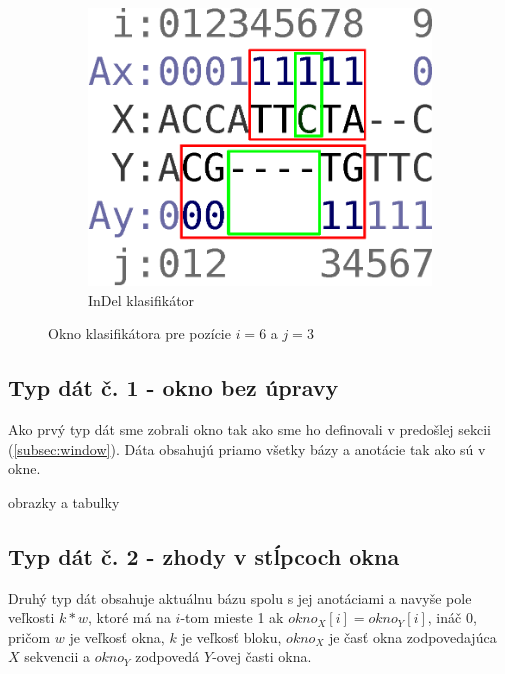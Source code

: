 \begin{figure}[h]
\begin{subfigure}[b]{0.35\textwidth}
                \includegraphics[width=\textwidth]{images/window_i}
                \caption{InDel klasifikátor}
                \label{fig:window-i}
        \end{subfigure}
        \caption{Okno klasifikátora pre pozície $i = 6$ a $j = 3$}
\end{figure}


\subsection{Typ dát č. 1 - okno bez úpravy}
\label{subsec:datatype1}

Ako prvý typ dát sme zobrali okno tak ako sme ho definovali v predošlej sekcii (\ref{subsec:window}). Dáta obsahujú priamo všetky bázy a anotácie tak ako sú v okne.

\todo obrazky a tabulky


\subsection{Typ dát č. 2 - zhody v stĺpcoch okna}
\label{subsec:datatype2}

Druhý typ dát obsahuje aktuálnu bázu spolu s jej anotáciami a navyše pole veľkosti $k*w$, ktoré má na $i$-tom mieste 1 ak $okno_X[i] = okno_Y[i]$, ináč 0, pričom $w$ je veľkosť okna, $k$ je veľkosť bloku, $okno_X$ je časť okna zodpovedajúca $X$ sekvencii a $okno_Y$ zodpovedá $Y$-ovej časti okna.

